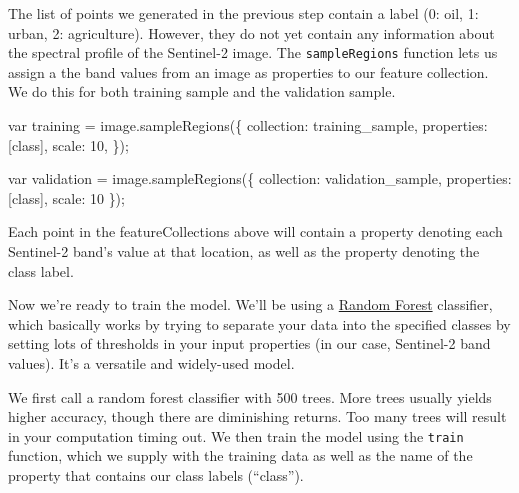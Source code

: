 \documentclass[
  letterpaper,
  DIV=11,
  numbers=noendperiod]{scrreprt}
\newenvironment{Shaded}{\begin{snugshade}}{\end{snugshade}}
\newcommand{\DataTypeTok}[1]{\textcolor[rgb]{0.68,0.00,0.00}{#1}}
\newcommand{\DecValTok}[1]{\textcolor[rgb]{0.68,0.00,0.00}{#1}}
\newcommand{\FunctionTok}[1]{\textcolor[rgb]{0.28,0.35,0.67}{#1}}
\newcommand{\KeywordTok}[1]{\textcolor[rgb]{0.00,0.23,0.31}{#1}}
\newcommand{\NormalTok}[1]{\textcolor[rgb]{0.00,0.23,0.31}{#1}}
\newcommand{\OperatorTok}[1]{\textcolor[rgb]{0.37,0.37,0.37}{#1}}
\newcommand{\StringTok}[1]{\textcolor[rgb]{0.13,0.47,0.30}{#1}}
\begin{document}
The list of points we generated in the previous step contain a label (0:
oil, 1: urban, 2: agriculture). However, they do not yet contain any
information about the spectral profile of the Sentinel-2 image. The
\texttt{sampleRegions} function lets us assign a the band values from an
image as properties to our feature collection. We do this for both
training sample and the validation sample.

\begin{Shaded}
\begin{Highlighting}[]
\KeywordTok{var}\NormalTok{ training }\OperatorTok{=}\NormalTok{ image}\OperatorTok{.}\FunctionTok{sampleRegions}\NormalTok{(\{}
  \DataTypeTok{collection}\OperatorTok{:}\NormalTok{ training\_sample}\OperatorTok{,}
  \DataTypeTok{properties}\OperatorTok{:}\NormalTok{ [}\StringTok{\textquotesingle{}class\textquotesingle{}}\NormalTok{]}\OperatorTok{,}
  \DataTypeTok{scale}\OperatorTok{:} \DecValTok{10}\OperatorTok{,}
\NormalTok{\})}\OperatorTok{;}

\KeywordTok{var}\NormalTok{ validation }\OperatorTok{=}\NormalTok{ image}\OperatorTok{.}\FunctionTok{sampleRegions}\NormalTok{(\{}
  \DataTypeTok{collection}\OperatorTok{:}\NormalTok{ validation\_sample}\OperatorTok{,}
  \DataTypeTok{properties}\OperatorTok{:}\NormalTok{ [}\StringTok{\textquotesingle{}class\textquotesingle{}}\NormalTok{]}\OperatorTok{,}
  \DataTypeTok{scale}\OperatorTok{:} \DecValTok{10}
\NormalTok{\})}\OperatorTok{;}
\end{Highlighting}
\end{Shaded}

Each point in the featureCollections above will contain a property
denoting each Sentinel-2 band's value at that location, as well as the
property denoting the class label.

Now we're ready to train the model. We'll be using a
\href{https://en.wikipedia.org/wiki/Random_forest}{Random Forest}
classifier, which basically works by trying to separate your data into
the specified classes by setting lots of thresholds in your input
properties (in our case, Sentinel-2 band values). It's a versatile and
widely-used model.

We first call a random forest classifier with 500 trees. More trees
usually yields higher accuracy, though there are diminishing returns.
Too many trees will result in your computation timing out. We then train
the model using the \texttt{train} function, which we supply with the
training data as well as the name of the property that contains our
class labels (``class'').
\end{document}
